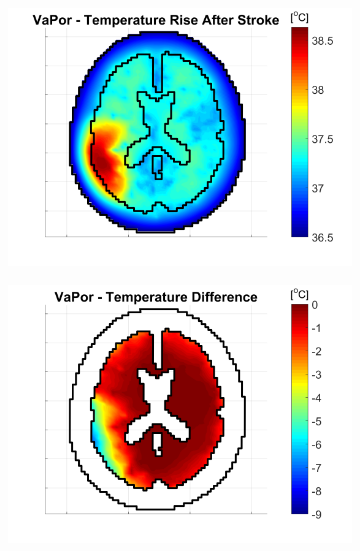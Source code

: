 \documentclass[11pt,english,a4paper,twoside,openright]{report}
\begin{document}
{{{{{{{\begin{figure}[h]
	\centering
	\begin{subfigure}[b]{0.49\textwidth}
		\includegraphics[width=\textwidth]{Chapter5/Chapter5_StrokeTemp2}
	\end{subfigure}
	\begin{subfigure}[b]{0.49\textwidth}
		\includegraphics[width=\textwidth]{Chapter5/Chapter5_StrokeTemp4}
	\end{subfigure}
	\begin{subfigure}[b]{0.49\textwidth}

\end{subfigure}
\end{figure}}}}}}}}
\end{document}
